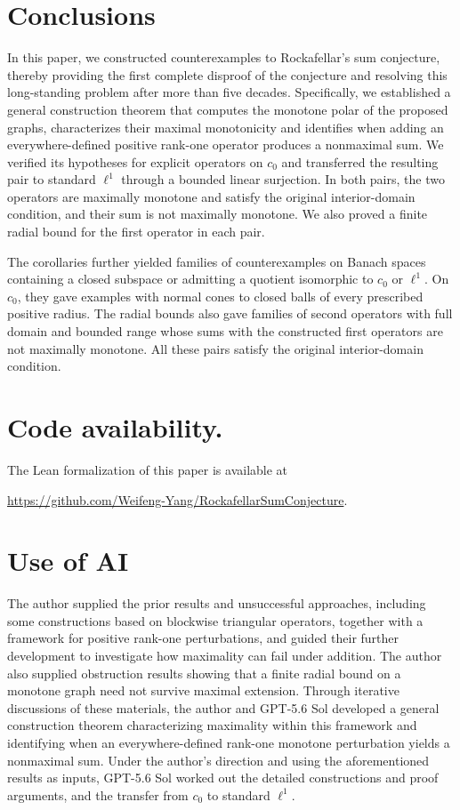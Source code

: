 \documentclass[11pt]{article}
\theoremstyle{definition}
\theoremstyle{remark}
\begin{document}
\section{Conclusions}
\label{sec:conclusion}

In this paper, we constructed counterexamples to Rockafellar's sum conjecture, thereby providing the first complete disproof of the conjecture and resolving this long-standing problem after more than five decades. Specifically, we established a general construction theorem that computes the monotone polar of the proposed graphs, characterizes their maximal monotonicity and identifies when adding an everywhere-defined positive rank-one operator produces a nonmaximal sum. We verified its hypotheses for explicit operators on $c_0$ and transferred the resulting pair to standard $\ell^1$ through a bounded linear surjection. In both pairs, the two operators are maximally monotone and satisfy the original interior-domain condition, and their sum is not maximally monotone. We also proved a finite radial bound for the first operator in each pair.


The corollaries further yielded families of counterexamples on Banach spaces containing a closed subspace or admitting a quotient isomorphic to $c_0$ or $\ell^1$. On $c_0$, they gave examples with normal cones to closed balls of every prescribed positive radius. The radial bounds also gave families of second operators with full domain and bounded range whose sums with the constructed first operators are not maximally monotone. All these pairs satisfy the original interior-domain condition.

\section*{Code availability.}
The Lean formalization of this paper is available at
\par\noindent\url{https://github.com/Weifeng-Yang/RockafellarSumConjecture}.


\section*{Use of AI}
The author supplied the prior results and unsuccessful approaches, including some constructions based on blockwise triangular operators, together with a framework for positive rank-one perturbations, and guided their further development to investigate how maximality can fail under addition. The author also supplied obstruction results showing that a finite radial bound on a monotone graph need not survive maximal extension. Through iterative discussions of these materials, the author and GPT-5.6 Sol developed a general construction theorem characterizing maximality within this framework and identifying when an everywhere-defined rank-one monotone perturbation yields a nonmaximal sum.  Under the author's direction and using the aforementioned results as inputs, GPT-5.6 Sol worked out the detailed constructions and proof arguments, and the transfer from $c_0$ to standard $\ell^1$. 
\end{document}
